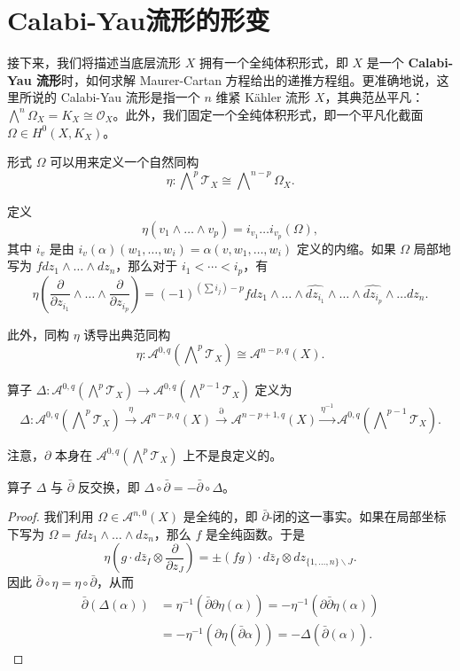 \section{Calabi-Yau流形的形变}

接下来，我们将描述当底层流形 $X$ 拥有一个全纯体积形式，即 $X$ 是一个 \textbf{Calabi-Yau 流形}时，如何求解 Maurer-Cartan 方程给出的递推方程组。更准确地说，这里所说的 Calabi-Yau 流形是指一个 $n$ 维紧 Kähler 流形 $X$，其典范丛平凡：$\bigwedge^n\varOmega_X=K_X \cong \mathcal{O}_X$。此外，我们固定一个全纯体积形式，即一个平凡化截面 $\varOmega\in H^0(X,K_X)$。

形式 $\varOmega$ 可以用来定义一个自然同构\[
    \eta:\bigwedge\nolimits^p\mathcal{T}_X\cong \bigwedge\nolimits^{n-p}\varOmega_X.
\]

定义\[
    \eta(v_1\wedge\dots\wedge v_p)=i_{v_1}\dots i_{v_p}(\varOmega),
\]其中 $i_v$ 是由 $i_v(\alpha)(w_1,\dots,w_i)=\alpha(v,w_1,\dots,w_i)$ 定义的内缩。如果 $\varOmega$ 局部地写为 $fdz_1\wedge\dots\wedge dz_n$，那么对于 $i_1 < \cdots <i_p$，有\[
    \eta(\frac{\partial}{\partial z_{i_1}}\wedge\dots\wedge\frac{\partial}{\partial z_{i_p}})={(-1)}^{(\sum i_j)-p}fdz_1\wedge\dots\wedge\widehat{dz_{i_1}}\wedge\dots\wedge\widehat{dz_{i_p}}\wedge\dots dz_n.
\]

此外，同构 $\eta$ 诱导出典范同构\[
    \eta:\mathcal{A}^{0,q}(\bigwedge\nolimits^p\mathcal{T}_X)\cong\mathcal{A}^{n-p,q}(X).
\]

\begin{definition}
    算子 $\varDelta:\mathcal{A}^{0,q}(\bigwedge^p\mathcal{T}_X)\rightarrow \mathcal{A}^{0,q}(\bigwedge^{p-1}\mathcal{T}_X)$ 定义为\[
        \varDelta:\mathcal{A}^{0,q}(\bigwedge\nolimits^p\mathcal{T}_X)\stackrel{\eta}{\longrightarrow}\mathcal{A}^{n-p,q}(X)\stackrel{\partial}{\longrightarrow}\mathcal{A}^{n-p+1,q}(X)\stackrel{\eta^{-1}}{\longrightarrow}\mathcal{A}^{0,q}(\bigwedge\nolimits^{p-1}\mathcal{T}_X).
    \]
\end{definition}

注意，$\partial$ 本身在 $\mathcal{A}^{0,q}(\bigwedge^p\mathcal{T}_X)$ 上不是良定义的。

\begin{lemma}
    算子 $\varDelta$ 与 $\bar{\partial}$ 反交换，即 $\varDelta\circ\bar{\partial}=-\bar{\partial}\circ\varDelta$。
\end{lemma}

\begin{proof}
    我们利用 $\varOmega\in\mathcal{A}^{n,0}(X)$ 是全纯的，即 $\bar{\partial}$-闭的这一事实。如果在局部坐标下写为 $\varOmega=fdz_1\wedge\dots\wedge dz_n$，那么 $f$ 是全纯函数。于是\[
        \eta(g\cdot d\bar{z}_{I}\otimes\frac{\partial}{\partial z_J})=\pm(fg)\cdot d\bar{z}_{I}\otimes dz_{\{1,\dots,n\}\backslash J}.
    \]因此 $\bar{\partial}\circ\eta=\eta\circ\bar{\partial}$，从而\begin{align*}
        \bar{\partial}(\varDelta(\alpha))&=\eta^{-1}(\bar{\partial}\partial\eta(\alpha))=-\eta^{-1}(\partial\bar{\partial}\eta(\alpha))\\
        &=-\eta^{-1}(\partial\eta(\bar{\partial}\alpha))=-\varDelta(\bar{\partial}(\alpha)).
    \end{align*}
\end{proof}

